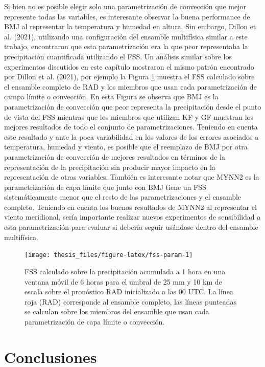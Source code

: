 \documentclass[12pt,oneside,a4paper]{reedthesis}
\begin{document}
Si bien no es posible elegir solo una parametrización de convección que mejor represente todas las variables, es interesante observar la buena performance de BMJ al representar la temperatura y humedad en altura. Sin embargo, Dillon et al. (2021), utilizando una configuración del ensamble multifísica similar a este trabajo, encontraron que esta parametrización era la que peor representaba la precipitación cuantificada utilizando el FSS. Un análisis similar sobre los experimentos discutidos en este capítulo mostraron el mismo patrón encontrado por Dillon et al. (2021), por ejemplo la Figura \ref{fig:fss-param} muestra el FSS calculado sobre el ensamble completo de RAD y los miembros que usan cada parametrización de campa límite o convección. En esta Figura se observa que BMJ es la parametrización de convección que peor representa la precipitación desde el punto de vista del FSS mientras que los miembros que utilizan KF y GF muestran los mejores resultados de todo el conjunto de parametrizaciones. Teniendo en cuenta este resultado y ante la poca variabilidad en los valores de los errores asociados a temperatura, humedad y viento, es posible que el reemplazo de BMJ por otra parametrización de convección de mejores resultados en términos de la representación de la precipitación sin producir mayor impacto en la representación de otras variables. También es interesante notar que MYNN2 es la parametrización de capa límite que junto con BMJ tiene un FSS sistemáticamente menor que el resto de las parametrizaciones y el ensamble completo. Teniendo en cuenta los buenos resultados de MYNN2 al representar el viento meridional, sería importante realizar nuevos experimentos de sensibilidad a esta parametrización para evaluar si debería seguir usándose dentro del ensamble multifísica.




\begin{figure}

\texttt{[image: thesis\_files/figure-latex/fss-param-1]} \hfill{}

\caption{FSS calculado sobre la precipitación acumulada a 1 hora en una ventana móvil de 6 horas para el umbral de 25 mm y 10 km de escala sobre el pronóstico RAD inicializado a las 00 UTC. La línea roja (RAD) corresponde al ensamble completo, las líneas punteadas se calculan sobre los miembros del ensamble que usan cada parametrización de capa límite o convección.}\label{fig:fss-param}
\end{figure}
\hypertarget{conclusiones-1}{%
\section{Conclusiones}\label{conclusiones-1}}
\end{document}
